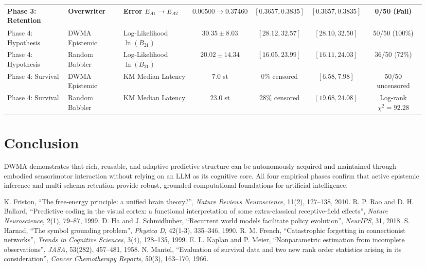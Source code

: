 \documentclass[11pt,a4paper]{article}
\begin{document}
\begin{table}[t]
\begin{tabular}{lllcccc}
Phase 3: Retention & Overwriter & Error $E_{A1} \to E_{A2}$ & $0.00500 \to 0.37460$ & $[0.3657, 0.3835]$ & $[0.3657, 0.3835]$ & 0/50 (Fail) \\
\midrule
Phase 4: Hypothesis & DWMA Epistemic & Log-Likelihood $\ln(B_{21})$ & $30.35 \pm 8.03$ & $[28.12, 32.57]$ & $[28.10, 32.50]$ & 50/50 (100\%) \\
Phase 4: Hypothesis & Random Babbler & Log-Likelihood $\ln(B_{21})$ & $20.02 \pm 14.34$ & $[16.05, 23.99]$ & $[16.11, 24.03]$ & 36/50 (72\%) \\
Phase 4: Survival & DWMA Epistemic & KM Median Latency & $7.0$ st & 0\% censored & $[6.58, 7.98]$ & 50/50 uncensored \\
Phase 4: Survival & Random Babbler & KM Median Latency & $23.0$ st & 28\% censored & $[19.68, 24.08]$ & Log-rank $\chi^2 = 92.28$ \\
\bottomrule
\end{tabular}
\end{table}

\section{Conclusion}
DWMA demonstrates that rich, reusable, and adaptive predictive structure can be autonomously acquired and maintained through embodied sensorimotor interaction without relying on an LLM as its cognitive core. All four empirical phases confirm that active epistemic inference and multi-schema retention provide robust, grounded computational foundations for artificial intelligence.

\begin{thebibliography}{9}
 K. Friston, ``The free-energy principle: a unified brain theory?'', \textit{Nature Reviews Neuroscience}, 11(2), 127--138, 2010.
 R. P. Rao and D. H. Ballard, ``Predictive coding in the visual cortex: a functional interpretation of some extra-classical receptive-field effects'', \textit{Nature Neuroscience}, 2(1), 79--87, 1999.
 D. Ha and J. Schmidhuber, ``Recurrent world models facilitate policy evolution'', \textit{NeurIPS}, 31, 2018.
 S. Harnad, ``The symbol grounding problem'', \textit{Physica D}, 42(1-3), 335--346, 1990.
 R. M. French, ``Catastrophic forgetting in connectionist networks'', \textit{Trends in Cognitive Sciences}, 3(4), 128--135, 1999.
 E. L. Kaplan and P. Meier, ``Nonparametric estimation from incomplete observations'', \textit{JASA}, 53(282), 457--481, 1958.
 N. Mantel, ``Evaluation of survival data and two new rank order statistics arising in its consideration'', \textit{Cancer Chemotherapy Reports}, 50(3), 163--170, 1966.
\end{thebibliography}
\end{document}
